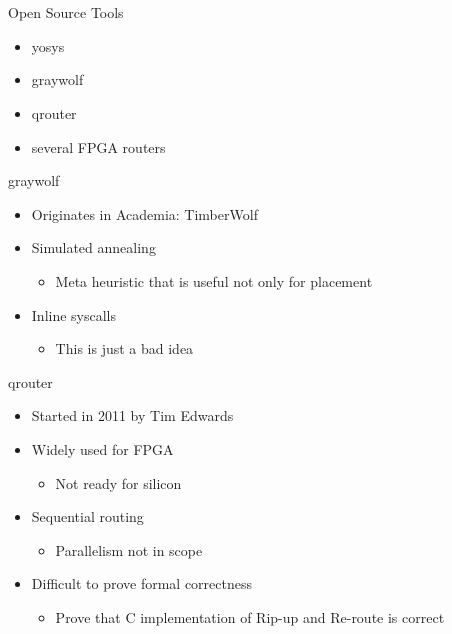 \documentclass[aspectratio=169]{beamer}
\begin{document}
\section[Silicon Compiler]{}
\begin{frame}{Open Source Tools}
	\begin{itemize}
        \setlength\itemsep{1em}
		\item yosys
		\item graywolf
		\item qrouter
		\item several FPGA routers
	\end{itemize}
\end{frame}

\begin{frame}{graywolf}
	\begin{itemize}
        \setlength\itemsep{1em}
		\item Originates in Academia: TimberWolf
		\item Simulated annealing
	        \begin{itemize}
		    \item Meta heuristic that is useful not only for placement
	        \end{itemize}
		\item Inline syscalls
	        \begin{itemize}
		    \item This is just a bad idea
	        \end{itemize}
	\end{itemize}
\end{frame}

\begin{frame}{qrouter}
	\begin{itemize}
        \setlength\itemsep{1em}
		\item Started in 2011 by Tim Edwards 
		\item Widely used for FPGA
	        \begin{itemize}
		    \item Not ready for silicon
	        \end{itemize}
		\item Sequential routing
	        \begin{itemize}
		    \item Parallelism not in scope
	        \end{itemize}
		\item Difficult to prove formal correctness
	        \begin{itemize}
		    \item Prove that C implementation of Rip-up and Re-route is correct
	        \end{itemize}
	\end{itemize}
\end{frame}
\end{document}
